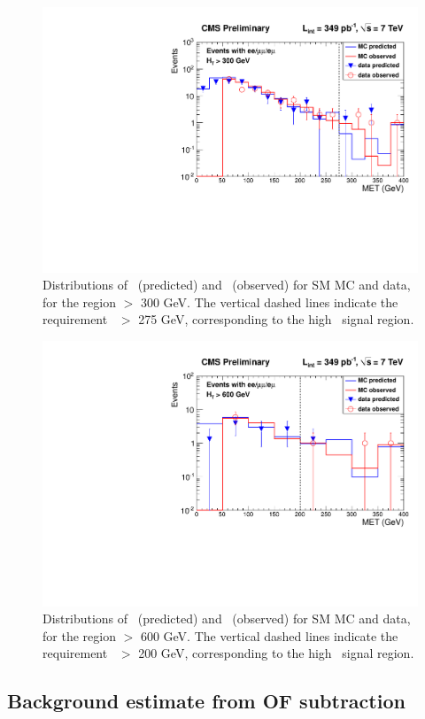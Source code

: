 \begin{figure}[h!]
\begin{center}
\includegraphics[width=0.6\linewidth]{plots/victory_met275_ht300_349pb.pdf}
\caption{\label{fig:v2}\protect 
Distributions of \ptll\ (predicted) and \met\ (observed) for 
SM MC and data, for the region \Ht $>$ 300 GeV. 
The vertical dashed lines indicate the requirement \met\ $>$ 275 GeV, corresponding to the high \met\ signal region.
}
\end{center}
\end{figure}

\begin{figure}[tbh]
\begin{center}
\includegraphics[width=0.6\linewidth]{plots/victory_met200_ht600_349pb.pdf}
\caption{\label{fig:vic3}\protect 
Distributions of \ptll\ (predicted) and \met\ (observed) for 
SM MC and data, for the region \Ht $>$ 600 GeV. 
The vertical dashed lines indicate the requirement \met\ $>$ 200 GeV, corresponding to the high \Ht\ signal region.
}
\end{center}
\end{figure}

\clearpage

\subsection{Background estimate from OF subtraction}
\label{sec:ofres}

